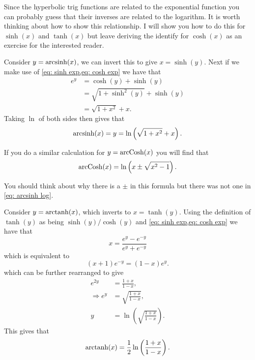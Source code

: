 Since the hyperbolic trig functions are related to the exponential function you can probably guess that their inverses are related to the logarithm. It is worth thinking about how to show this relationship. I will show you how to do this for $\sinh(x)$ and $\tanh(x)$ but leave deriving the identify for $\cosh(x)$ as an exercise for the interested reader.

\begin{ex}
Consider $y=\operatorname{arcsinh}(x)$, we can invert this to give $x=\sinh(y)$. Next if we make use of \cref{eq: sinh exp,eq: cosh exp} we have that
\begin{align*}
e^{y}	&=\cosh(y)+\sinh(y)\\
	&=\sqrt{1+\sinh^{2}(y)}+\sinh(y)\\
	&=\sqrt{1+x^{2}}+x.
\end{align*}
Taking $\ln$ of both sides then gives that
\begin{equation}
\operatorname{arcsinh}(x)=y=\ln\left(\sqrt{1+x^{2}}+x\right).
\label{eq: arcsinh log}
\end{equation}
\end{ex} 

If you do a similar calculation for $y=\operatorname{arcCosh}(x)$ you will find that
\begin{equation}
\operatorname{arcCosh}(x)=\ln\left(x\pm \sqrt{x^{2}-1}\right).
\label{eq: arccosh log}
\end{equation} 

You should think about why there is a $\pm$ in this formula but there was not one in \cref{eq: arcsinh log}.

\begin{ex}
Consider $y=\operatorname{arctanh}(x)$, which inverts to $x=\tanh(y)$. Using the definition of $\tanh(y)$ as being $\sinh(y)/\cosh(y)$ and \cref{eq: sinh exp,eq: cosh exp}  we have that
\begin{equation*}
x=\frac{e^{y}-e^{-y}}{e^{y}+e^{-y}}
\end{equation*}
which is equivalent to 
\begin{equation*}
\left(x+1\right)e^{-y}=\left(1-x\right)e^{y}.
\end{equation*}
which can be further rearranged to give
\begin{align*}
e^{2y}&=\frac{1+x}{1-x},\\
\Rightarrow e^{y}&=\sqrt{\frac{1+x}{1-x}},\\
y&=\ln\left(\sqrt{\frac{1+x}{1-x}}\right).
\end{align*}
This gives that 
\begin{equation}
\operatorname{arctanh}(x)=\frac{1}{2}\ln\left(\frac{1+x}{1-x}\right).
\label{eq: arctanh log}
\end{equation} 

\end{ex}

